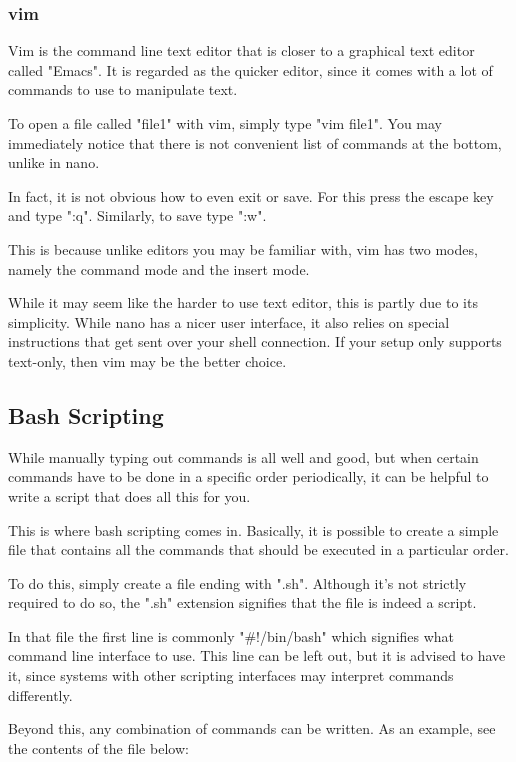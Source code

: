 \documentclass[12pt,article]{memoir}
\begin{document}
\subsubsection{vim}
Vim is the command line text editor that is closer to a graphical text editor called "Emacs". It is regarded as the quicker editor, since it comes with a lot of commands to use to manipulate text.\par
To open a file called "file1" with vim, simply type "vim file1". You may immediately notice that there is not convenient list of commands at the bottom, unlike in nano.\par
In fact, it is not obvious how to even exit or save. For this press the escape key and type ":q". Similarly, to save type ":w".\par
This is because unlike editors you may be familiar with, vim has two modes, namely the command mode and the insert mode.\par
While it may seem like the harder to use text editor, this is partly due to its simplicity. While nano has a nicer user interface, it also relies on special instructions that get sent over your shell connection. If your setup only supports text-only, then vim may be the better choice.

\newpage
\subsection{Bash Scripting}
While manually typing out commands is all well and good, but when certain commands have to be done in a specific order periodically, it can be helpful to write a script that does all this for you.\par
This is where bash scripting comes in. Basically, it is possible to create a simple file that contains all the commands that should be executed in a particular order.\par
To do this, simply create a file ending with ".sh". Although it's not strictly required to do so, the ".sh" extension signifies that the file is indeed a script.\par
In that file the first line is commonly "\#!/bin/bash" which signifies what command line interface to use. This line can be left out, but it is advised to have it, since systems with other scripting interfaces may interpret commands differently.\par
Beyond this, any combination of commands can be written. As an example, see the contents of the file below:
\end{document}
